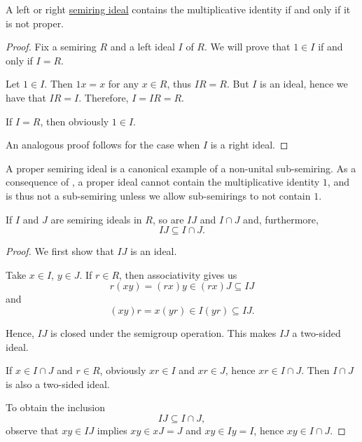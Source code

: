 \begin{proposition}\label{thm:proper_ideals_containing_identity}
  A left or right \hyperref[def:semiring_ideal]{semiring ideal} contains the multiplicative identity if and only if it is not proper.
\end{proposition}
\begin{proof}
  Fix a semiring \( R \) and a left ideal \( I \) of \( R \). We will prove that \( 1 \in I \) if and only if \( I = R \).

  \SufficiencySubProof Let \( 1 \in I \). Then \( 1x = x \) for any \( x \in R \), thus \( IR = R \). But \( I \) is an ideal, hence we have that \( IR = I \). Therefore, \( I = IR = R \).

  \NecessitySubProof If \( I = R \), then obviously \( 1 \in I \).

  An analogous proof follows for the case when \( I \) is a right ideal.
\end{proof}

\begin{remark}\label{rem:semiring_ideal_as_sub_semiring}
  A proper semiring ideal is a canonical example of a non-unital sub-semiring. As a consequence of , a proper ideal cannot contain the multiplicative identity \( 1 \), and is thus not a sub-semiring unless we allow sub-semirings to not contain \( 1 \).
\end{remark}

\begin{proposition}\label{thm:product_of_semigroup_ideals_is_in_intersection}
  If \( I \) and \( J \) are semiring ideals in \( R \), so are \( IJ \) and \( I \cap J \) and, furthermore,
  \begin{equation*}
    IJ \subseteq I \cap J.
  \end{equation*}
\end{proposition}
\begin{proof}
  We first show that \( IJ \) is an ideal.

  Take \( x \in I \), \( y \in J \). If \( r \in R \), then associativity gives us
  \begin{equation*}
    r(xy) = (rx)y \in (rx)J \subseteq IJ
  \end{equation*}
  and
  \begin{equation*}
    (xy)r = x(yr) \in I(yr) \subseteq IJ.
  \end{equation*}

  Hence, \( IJ \) is closed under the semigroup operation. This makes \( IJ \) a two-sided ideal.

  If \( x \in I \cap J \) and \( r \in R \), obviously \( xr \in I \) and \( xr \in J \), hence \( xr \in I \cap J \). Then \( I \cap J \) is also a two-sided ideal.

  To obtain the inclusion
  \begin{equation*}
    IJ \subseteq I \cap J,
  \end{equation*}
  observe that \( xy \in IJ \) implies \( xy \in xJ = J \) and \( xy \in Iy = I \), hence \( xy \in I \cap J \).
\end{proof}

